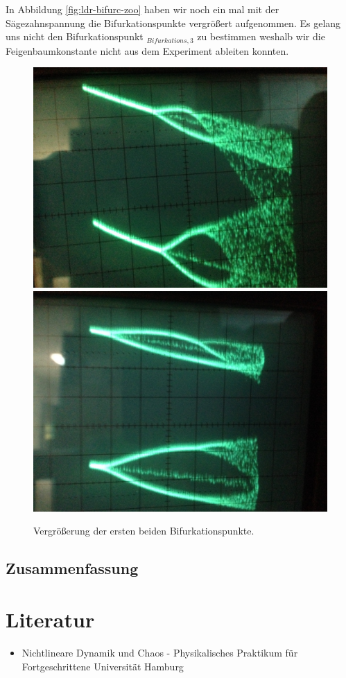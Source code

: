 \documentclass{scrartcl}
\begin{document}
In Abbildung \ref{fig:ldr-bifurc-zoo} haben wir noch ein mal mit der Sägezahnspannung die Bifurkationspunkte vergrößert aufgenommen. Es gelang uns nicht den Bifurkationspunkt $_{Bifurkations, 3}$ zu bestimmen weshalb wir die Feigenbaumkonstante nicht aus dem Experiment ableiten konnten.

\begin{figure}
\centering
\includegraphics[scale=0.18]{bif-ldr/bifurc-zoom}
\includegraphics[scale=0.18]{bif-ldr/bifurc-zoom2}
\caption{Vergrößerung der ersten beiden Bifurkationspunkte.}
\label{fig:ldr-bifurc-zoom}
\end{figure}


\subsection { Zusammenfassung }

\section{ Literatur }
\nocite{*}
\printbibliography
\begin{itemize} 
\item Nichtlineare Dynamik und Chaos - Physikalisches Praktikum für Fortgeschrittene Universität Hamburg
\end{itemize}
\end{document}
